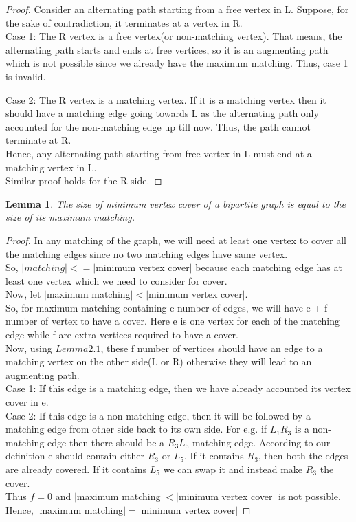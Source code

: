 \documentclass[11pt]{article}
\newtheorem{lemma}[theorem]{Lemma}
\begin{document}
\begin{proof}
	Consider an alternating path starting from a free vertex in L. Suppose, for the sake of contradiction, it terminates at a 
	vertex in R. \\
	Case 1: The R vertex is a free vertex(or non-matching vertex). That means, the alternating path starts and ends at free 
	vertices, so it is an augmenting path which is not possible since we already have the maximum matching. Thus, case 1 is invalid.
	
	Case 2: The R vertex is a matching vertex. If it is a matching vertex then it should have a matching edge going towards L
	as the alternating path only accounted for the non-matching edge up till now.
	Thus, the path cannot terminate at R. \\
	Hence, any alternating path starting from free vertex in L must end at a matching vertex in L. \\
	Similar proof holds for the R side.
\end{proof}
\begin{lemma}
	The size of minimum vertex cover of a bipartite graph is equal to the size of its maximum matching.
\end{lemma} 
\begin{proof}
	In any matching of the graph, we will need at least one vertex to cover all the matching edges since no two matching edges
	have same vertex. \\
	So, $|matching| <= |$minimum vertex cover$|$ because each matching edge has at least one vertex which we need to consider for
	cover. \\
	Now, let $|$maximum matching$| < |$minimum vertex cover$|$. \\
	So, for maximum matching containing e number of edges, we will have e + f number of vertex to have a cover. Here e is one vertex 
	for each of the matching edge while f are extra vertices required to have a cover. \\ 
	Now, using $Lemma 2.1$, these f number of vertices should have an edge to a matching vertex on the other side(L or R) otherwise 
	they will lead to an augmenting path. \\
	Case 1: If this edge is a matching edge, then we have already accounted its vertex cover in e.\\
	Case 2: If this edge is a non-matching edge, then it will be followed by a matching edge from other side back to its own side.
	For e.g.  if $L_1 R_3$ is a non-matching edge then there should be a $R_3 L_5$ matching edge. According to our definition
	e should contain either $R_3$ or $L_5$. If it contains $R_3$, then both the edges are already covered. If it contains $L_5$
	we can swap it and instead make $R_3$ the cover. \\
	Thus $f = 0$ and  $|$maximum matching$| < |$minimum vertex cover$|$ is not possible. \\
	Hence, $|$maximum matching$| = |$minimum vertex cover$|$	
\end{proof}
\end{document}
